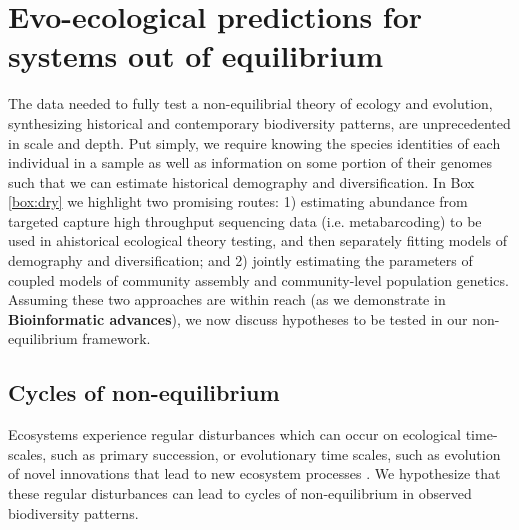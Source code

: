 \documentclass[12pt]{article}
\newcounter{Box}
\begin{document}
\section{Evo-ecological predictions for systems out of equilibrium} \label{sec:pred}

The data needed to fully test a non-equilibrial theory of ecology and
evolution, synthesizing historical and contemporary biodiversity
patterns, are unprecedented in scale and depth. Put simply, we require
knowing the species identities of each individual in a sample as well
as information on some portion of their genomes such that we can
estimate historical demography and diversification. In Box
\ref{box:dry} we
highlight two promising routes: 1) estimating abundance from targeted
capture high throughput sequencing data (i.e.  metabarcoding) to be
used in ahistorical ecological theory testing, and then separately
fitting models of demography and diversification; and 2) jointly
estimating the parameters of coupled models of community assembly and
community-level population genetics. Assuming these two approaches are within
% 
% 
% 
reach (as we demonstrate in \textbf{Bioinformatic advances}), we now
discuss hypotheses to be tested in our non-equilibrium framework.

\subsection{Cycles of non-equilibrium}

Ecosystems experience regular disturbances which can
occur on ecological time-scales, such as primary succession, or
evolutionary time scales, such as evolution of novel innovations that
lead to new ecosystem processes \citep{redQueen, erwin2008}. We
hypothesize that these regular disturbances can lead to cycles of
non-equilibrium in observed biodiversity patterns.
\end{document}
